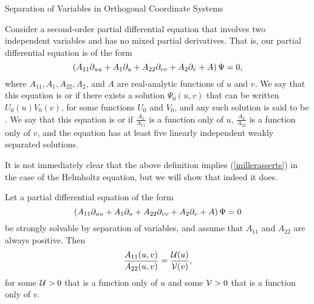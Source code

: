 \begin{section}{Separation of Variables in Orthogonal Coordinate Systems}
\begin{definition}
\label{sepofvard}
Consider a second-order partial differential equation that involves two independent variables and has no mixed partial derivatives.  That is, our partial differential equation is of the form
\[
\left( A_{11} \partial_{u u} + A_1 \partial_{u} + A_{22} \partial_{v v} + A_2 \partial_{v} + A \right) \Psi = 0,
\]
where $A_{11}, A_1, A_{22}, A_2$, and $A$ are real-analytic functions of $u$ and $v$.  We say that this equation is  or  if there exists a solution $\Psi_0(u,v)$ that can be written $U_0(u)V_0(v)$, for some functions $U_0$ and $V_0$, and any such solution is said to be .  We say that this equation is  or  if $\frac{A_1}{A_{11}}$ is a function only of $u$, $\frac{A_2}{A_{22}}$ is a function only of $v$, and the equation has at least five linearly independent weakly separated solutions.
\end{definition}

It is not immediately clear that the above definition implies (\ref{millerasserts}) in the case of the Helmholtz equation, but we will show that indeed it does.

\begin{lemma}
\label{helmstrong}
Let a partial differential equation of the form
\begin{equation}
\label{genpde}
\left( A_{11} \partial_{u u} + A_1 \partial_{u} + A_{22} \partial_{v v} + A_2 \partial_{v} + A \right) \Psi = 0
\end{equation}
be strongly solvable by separation of variables, and assume that $A_{11}$ and $A_{22}$ are always positive.  Then
\[
\frac{A_{11}(u,v)}{A_{22}(u,v)} = \frac{\mathcal{U}(u)}{\mathcal{V}(v)},
\]
for some $\mathcal{U} > 0$ that is a function only of $u$ and some $\mathcal{V} > 0$ that is a function only of $v$.
\end{lemma}


\end{section}

